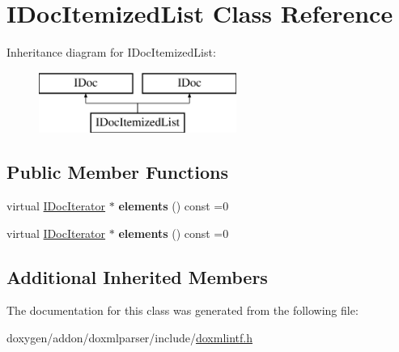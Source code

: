 \hypertarget{class_i_doc_itemized_list}{}\section{I\+Doc\+Itemized\+List Class Reference}
\label{class_i_doc_itemized_list}
Inheritance diagram for I\+Doc\+Itemized\+List\+:\begin{figure}[H]
\begin{center}
\leavevmode
\includegraphics[height=2.000000cm]{class_i_doc_itemized_list}
\end{center}
\end{figure}
\subsection*{Public Member Functions}
\begin{DoxyCompactItemize}
\item 
\mbox{\label{class_i_doc_itemized_list_aebfc55b713ca781ac518631743577752}} 
virtual \mbox{\hyperlink{class_i_doc_iterator}{I\+Doc\+Iterator}} $\ast$ {\bfseries elements} () const =0
\item 
\mbox{\label{class_i_doc_itemized_list_aebfc55b713ca781ac518631743577752}} 
virtual \mbox{\hyperlink{class_i_doc_iterator}{I\+Doc\+Iterator}} $\ast$ {\bfseries elements} () const =0
\end{DoxyCompactItemize}
\subsection*{Additional Inherited Members}


The documentation for this class was generated from the following file\+:\begin{DoxyCompactItemize}
\item 
doxygen/addon/doxmlparser/include/\mbox{\hyperlink{include_2doxmlintf_8h}{doxmlintf.\+h}}\end{DoxyCompactItemize}
